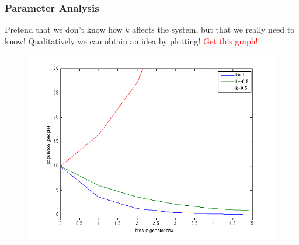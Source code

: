 \documentclass[serif]{beamer}
\begin{document}
\begin{frame}
\frametitle{Parameter Analysis} 

Pretend that we don't know how $k$ affects the system, but that we really need to know! Qualitatively we can obtain an idea by plotting! \textcolor{red}{Get this graph!}

\begin{figure}
\includegraphics[width=\textwidth,height=0.7\textheight]{./exp_pop}
\end{figure}

\end{frame}
\end{document}

